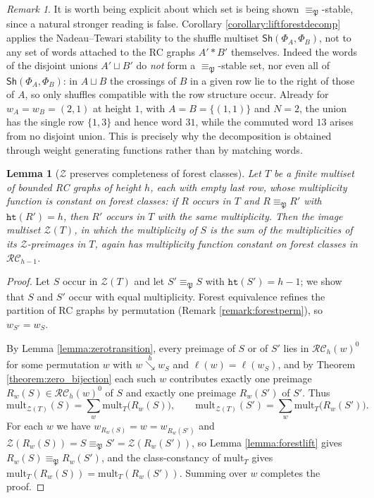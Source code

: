 \documentclass{amsart}
\newtheorem{lemma}{Lemma}[subsection]
\theoremstyle{definition}
\theoremstyle{remark}
\newtheorem*{remark}{Remark}
\numberwithin{equation}{subsection}
\newcommand{\downvar}[1]{\stackrel{#1}{\searrow}}
\newcommand{\wof}[1]{w_{#1}}
\newcommand{\zeromap}{\mathcal{Z}}
\newcommand{\hr}{\mathtt{ht}}
\newcommand{\RC}{\mathcal{RC}}
\newcommand{\forest}{\mathfrak{P}}
\begin{document}
\begin{remark}
It is worth being explicit about which set is being shown $\equiv_\forest$-stable, since a natural stronger reading is false. Corollary \ref{corollary:liftforestdecomp} applies the Nadeau--Tewari stability to the shuffle multiset $\mathsf{Sh}(\Phi_A,\Phi_B)$, not to any set of words attached to the RC graphs $A'*B'$ themselves. Indeed the words of the disjoint unions $A'\sqcup B'$ do \emph{not} form a $\equiv_\forest$-stable set, nor even all of $\mathsf{Sh}(\Phi_A,\Phi_B)$: in $A\sqcup B$ the crossings of $B$ in a given row lie to the right of those of $A$, so only shuffles compatible with the row structure occur. Already for $\wof A=\wof B=(2,1)$ at height $1$, with $A=B=\{(1,1)\}$ and $N=2$, the union has the single row $\{1,3\}$ and hence word $31$, while the commuted word $13$ arises from no disjoint union. This is precisely why the decomposition is obtained through weight generating functions rather than by matching words.
\end{remark}

\begin{lemma}[$\zeromap$ preserves completeness of forest classes]\label{lemma:zeroforestcomplete}
Let $T$ be a finite multiset of bounded RC graphs of height $h$, each with empty last row, whose multiplicity function is constant on forest classes: if $R$ occurs in $T$ and $R\equiv_\forest R'$ with $\hr(R')=h$, then $R'$ occurs in $T$ with the same multiplicity. Then the image multiset $\zeromap(T)$, in which the multiplicity of $S$ is the sum of the multiplicities of its $\zeromap$-preimages in $T$, again has multiplicity function constant on forest classes in $\RC_{h-1}$.
\end{lemma}
\begin{proof}
Let $S$ occur in $\zeromap(T)$ and let $S'\equiv_\forest S$ with $\hr(S')=h-1$; we show that $S$ and $S'$ occur with equal multiplicity. Forest equivalence refines the partition of RC graphs by permutation (Remark \ref{remark:forestperm}), so $\wof{S'}=\wof S$.

By Lemma \ref{lemma:zerotransition}, every preimage of $S$ or of $S'$ lies in $\RC_h(w)^0$ for some permutation $w$ with $w\downvar{h}\wof S$ and $\ell(w)=\ell(\wof S)$, and by Theorem \ref{theorem:zero_bijection} each such $w$ contributes exactly one preimage $R_w(S)\in\RC_h(w)^0$ of $S$ and exactly one preimage $R_w(S')$ of $S'$. Thus
$$\mathrm{mult}_{\zeromap(T)}(S)=\sum_{w}\mathrm{mult}_T\bigl(R_w(S)\bigr),\qquad \mathrm{mult}_{\zeromap(T)}(S')=\sum_{w}\mathrm{mult}_T\bigl(R_w(S')\bigr).$$
For each $w$ we have $\wof{R_w(S)}=w=\wof{R_w(S')}$ and $\zeromap(R_w(S))=S\equiv_\forest S'=\zeromap(R_w(S'))$, so Lemma \ref{lemma:forestlift} gives $R_w(S)\equiv_\forest R_w(S')$, and the class-constancy of $\mathrm{mult}_T$ gives $\mathrm{mult}_T(R_w(S))=\mathrm{mult}_T(R_w(S'))$. Summing over $w$ completes the proof.
\end{proof}
\end{document}
